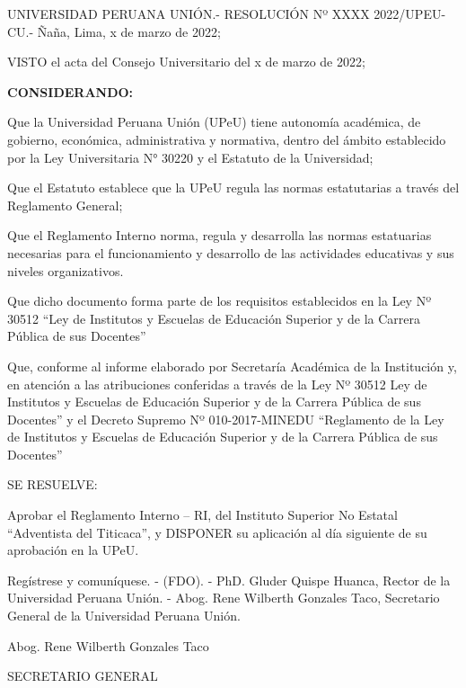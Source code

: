 \documentclass[xcolor=table,12pt, a4paper]{article}
\begin{document}
\begin{flushleft}
\small
UNIVERSIDAD PERUANA UNIÓN.-  RESOLUCIÓN Nº XXXX 2022/UPEU-CU.- Ñaña, Lima, x de marzo de 2022;

VISTO el acta del Consejo Universitario del x de marzo de 2022;
\end{flushleft}
\begin{flushleft}
\small
\textbf {CONSIDERANDO:}
\end{flushleft} 

\begin{flushleft}
\setlength{\parindent}{2cm}
\justifying
\small
Que la Universidad Peruana Unión (UPeU) tiene autonomía académica, de gobierno, económica, administrativa y normativa, dentro del ámbito establecido por la Ley Universitaria N° 30220 y el Estatuto de la Universidad;

Que el Estatuto establece que la UPeU regula las normas estatutarias a través del Reglamento General;

Que el Reglamento Interno norma, regula y desarrolla las normas estatuarias necesarias para el funcionamiento y desarrollo de las actividades educativas y sus niveles organizativos.

Que dicho documento forma parte de los requisitos establecidos en la Ley Nº 30512 “Ley de Institutos y Escuelas de Educación Superior y de la Carrera Pública de sus Docentes”

Que, conforme al informe elaborado por Secretaría Académica de la Institución y, en atención a las atribuciones conferidas a través de la Ley Nº 30512 Ley de Institutos y Escuelas de Educación Superior y de la Carrera Pública de sus Docentes” y el Decreto Supremo Nº 010-2017-MINEDU “Reglamento de la Ley de Institutos y Escuelas de Educación Superior y de la Carrera Pública de sus Docentes”
\end{flushleft}

\begin{flushleft}
\small
SE RESUELVE:
\end{flushleft}
\begin{flushleft}
\small
\justifying
Aprobar el Reglamento Interno – RI, del Instituto Superior No Estatal “Adventista del Titicaca”, y DISPONER su aplicación al día siguiente de su aprobación en la UPeU.

Regístrese y comuníquese. - (FDO). - PhD. Gluder Quispe Huanca, Rector de la Universidad Peruana Unión. - Abog. Rene Wilberth Gonzales Taco, Secretario General de la Universidad Peruana Unión.
\end{flushleft}

\begin{center}
\small
Abog. Rene Wilberth Gonzales Taco

SECRETARIO GENERAL
\end{center}



\newpage
\tableofcontents

\label{sec:bib}

\appendix

\end{document}
